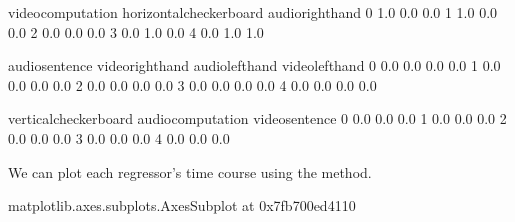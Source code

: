 \documentclass[letterpaper,10pt,english]{sphinxmanual}
\begin{document}
\begin{sphinxVerbatim}[commandchars=\\\{\}]
   video\PYGZus{}computation  horizontal\PYGZus{}checkerboard  audio\PYGZus{}right\PYGZus{}hand  \PYGZbs{}
0                1.0                      0.0               0.0   
1                1.0                      0.0               0.0   
2                0.0                      0.0               0.0   
3                0.0                      1.0               0.0   
4                0.0                      1.0               1.0   

   audio\PYGZus{}sentence  video\PYGZus{}right\PYGZus{}hand  audio\PYGZus{}left\PYGZus{}hand  video\PYGZus{}left\PYGZus{}hand  \PYGZbs{}
0             0.0               0.0              0.0              0.0   
1             0.0               0.0              0.0              0.0   
2             0.0               0.0              0.0              0.0   
3             0.0               0.0              0.0              0.0   
4             0.0               0.0              0.0              0.0   

   vertical\PYGZus{}checkerboard  audio\PYGZus{}computation  video\PYGZus{}sentence  
0                    0.0                0.0             0.0  
1                    0.0                0.0             0.0  
2                    0.0                0.0             0.0  
3                    0.0                0.0             0.0  
4                    0.0                0.0             0.0  
\end{sphinxVerbatim}

We can plot each regressor’s time course using the  method.

\begin{sphinxVerbatim}[commandchars=\\\{\}]
  
\end{sphinxVerbatim}

\begin{sphinxVerbatim}[commandchars=\\\{\}]
\PYGZlt{}matplotlib.axes.\PYGZus{}subplots.AxesSubplot at 0x7fb700ed4110\PYGZgt{}
\end{sphinxVerbatim}

\noindent{}
\end{document}
